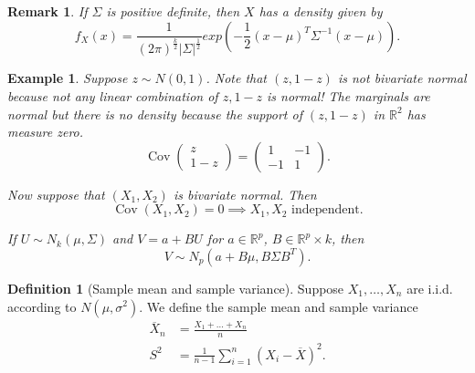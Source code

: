 \documentclass{tufte-handout}
\newcommand*\R{\mathbb{R}}
\newtheorem{rmk}[thm]{Remark}
\newtheorem{ex}[thm]{Example}
\theoremstyle{definition}
\newtheorem{defn}[thm]{Definition}
\begin{document}
\begin{rmk}
	If $\Sigma$ is positive definite, then $X$ has a density given by \[
		f_X(x) = \frac{1}{\left( 2\pi \right)^{\frac{k}{2}} \left| \Sigma \right|^{\frac{1}{2}}} exp\left( -\frac{1}{2} \left( x-\mu \right)^T \Sigma^{-1} (x -\mu) \right)
	.\] 
\end{rmk}

\begin{ex}
	Suppose $z \sim N(0,1)$. Note that  $(z,1-z)$ is not bivariate normal because not any linear combination of $z, 1-z$ is normal! The marginals are normal but there is no density because the support of $(z,1-z)$ in $\R^2$ has measure zero. \[
		\operatorname{Cov}\begin{pmatrix}
		z \\
		1-z
		\end{pmatrix} = \begin{pmatrix}
		1 & -1 \\
		-1 & 1
		\end{pmatrix} 
	.\] 

	Now suppose that $(X_1,X_2)$ is bivariate normal. Then \[
		\operatorname{Cov}(X_1,X_2) = 0 \implies X_1,X_2 \text{ independent.}
	\] 

	If $U \sim N_k(\mu, \Sigma)$ and $V = a + BU$ for $a \in \R^p$, $B \in \R^p \times k$, then \[
		V\sim N_p\left( a+B\mu, B\Sigma B^T \right)
	.\] 
\end{ex}

\begin{defn}[Sample mean and sample variance]
	Suppose $X_1,\ldots,X_n$ are i.i.d. according to $N(\mu,\sigma^2)$. We define the sample mean and sample variance
	\begin{align*}
		\overline{X}_n &= \frac{X_1+\ldots+X_n}{n}\\
		S^2 &= \frac{1}{n-1} \sum\limits_{i=1}^{n} \left( X_i - \overline{X} \right)^2
	.\end{align*}
\end{defn}
\end{document}
